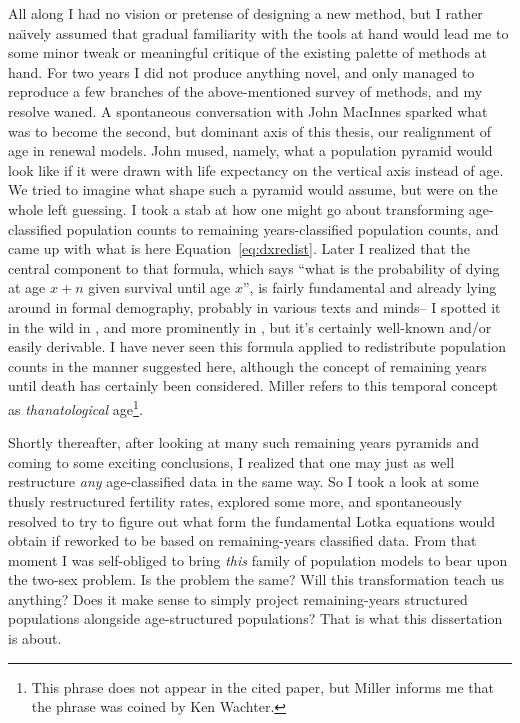 All along I had no vision or pretense of designing a new method, but I rather
na\"{\i}vely assumed that gradual familiarity with the tools at hand would lead
me to some minor tweak or meaningful critique of the existing palette of methods at
hand. For two years I did not produce anything novel, and only managed to
reproduce a few branches of the above-mentioned survey of methods, and my
resolve waned. A spontaneous conversation with John MacInnes sparked
what was to become the second, but dominant axis of this thesis, our realignment 
of age in renewal models. John
mused, namely, what a population pyramid would look like if it were drawn with
life expectancy on the vertical axis instead of age. We tried to imagine what
shape such a pyramid would assume, but were on the whole left guessing. I took a
stab at how one might go about transforming age-classified population counts to
remaining years-classified population counts, and came up with what is here
Equation~\ref{eq:dxredist}. Later I realized that the central component to that
formula, which says ``what is the probability of dying at age $x+n$ given
survival until age $x$'', is fairly fundamental and already lying around in
formal demography, probably in various texts and minds-- I spotted it in the
wild in \citet{vaupel2009life}, and more prominently in
\citet{miller2001increasing}, but it's certainly well-known and/or easily
derivable. I have never seen this formula applied to redistribute population counts in the manner
suggested here, although the concept of remaining years until death has
certainly been considered. Miller refers to this
temporal concept as \textit{thanatological} age\footnote{This phrase does not
appear in the cited paper, but Miller informs me that the phrase was
coined by Ken Wachter.}.

Shortly thereafter, after looking at many such remaining years pyramids and
coming to some exciting conclusions, I realized that one may just as well
restructure \textit{any} age-classified data in the same way. So I took a 
look at some thusly restructured fertility rates, explored
some more, and spontaneously resolved to try to figure out what form the
fundamental Lotka equations would obtain if reworked to be based on
remaining-years classified data. From that moment I was self-obliged to bring \textit{this} family of
population models to bear upon the two-sex problem. Is the problem the same?
Will this transformation teach us anything? Does it make sense to simply
project remaining-years structured populations alongside age-structured
populations? That is what this dissertation is about.

